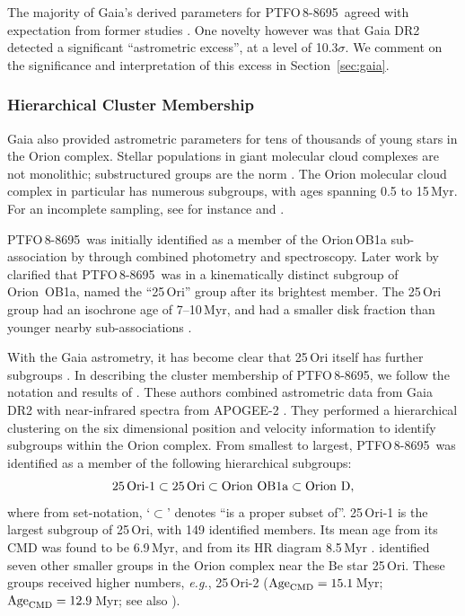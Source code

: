 \documentclass[12pt,twocolumn,tighten]{aastex62}
\newcommand{\ptfo}{PTFO$\,$8-8695}
\begin{document}
The majority of Gaia's derived parameters for \ptfo\ agreed with
expectation from former studies
\citep{briceno_cida_2005,van_eyken_ptf_2012}.  One novelty however was
that Gaia DR2 detected a significant ``astrometric excess'', at a
level of 10.3$\sigma$.  We comment on the significance and
interpretation of this excess in Section~\ref{sec:gaia}.


\subsubsection{Hierarchical Cluster Membership}
\label{subsec:hierarchical}

Gaia also provided astrometric parameters for tens of thousands of
young stars in the Orion complex.  Stellar populations in giant
molecular cloud complexes are not monolithic; substructured groups are
the norm \citep{briceno_lowmassOB_2007}.  The Orion molecular cloud
complex in particular has numerous subgroups, with ages spanning 0.5
to 15$\,$Myr. For an incomplete sampling, see for instance
\citet{briceno_cida_2005,jeffries_kinematic_2006,briceno_25_2007,kounkel_apogee2_2018}
and \citet{briceno_cidaII_2019}.

\ptfo\ was initially identified as a member of the Orion$\,$OB1a
sub-association by \citet{briceno_cida_2005} through combined
photometry and spectroscopy.  Later work by \citet{briceno_25_2007}
clarified that \ptfo\ was in a kinematically distinct subgroup of
Orion~OB1a, named the ``25$\,$Ori'' group after its brightest
member. The 25$\,$Ori group had an isochrone age of 7--10$\,$Myr, and
had a smaller disk fraction than younger nearby sub-associations
\citep{hernandez_spitzer_ob1_2007}.

With the Gaia astrometry, it has become clear that 25$\,$Ori itself
has further subgroups
\citep{kounkel_apogee2_2018,briceno_cidaII_2019}.  In describing the
cluster membership of \ptfo, we follow the notation and results of
\citet{kounkel_apogee2_2018}.  These authors combined astrometric data
from Gaia DR2 with near-infrared spectra from APOGEE-2
\citep{gunn_sdss_2006,majewski_apache_2017,blanton_sloan_2017,zasowski_target_2017,cottle_apogee2_2018}.
They performed a hierarchical clustering on the six dimensional
position and velocity information to identify subgroups within the
Orion complex.  From smallest to largest, \ptfo\ was identified
as a member of the following hierarchical subgroups:
\begin{equation}
  {\rm 25\,Ori\text{-}1}
  \subset {\rm 25\,Ori}
  \subset {\rm Orion\ OB1a}
  \subset {\rm Orion\ D},
\end{equation}
where from set-notation, `$\subset$' denotes ``is a proper subset
of''.  25$\,$Ori-1 is the largest subgroup of 25$\,$Ori, with 149
identified members.  Its mean age from its CMD was found to be
6.9$\,$Myr, and from its HR diagram 8.5$\,$Myr
\citep{kounkel_apogee2_2018}.  \citet{kounkel_apogee2_2018} identified
seven other smaller groups in the Orion complex near the Be star
25$\,$Ori. These groups received higher numbers, {\it e.g.},
25$\,$Ori-2 (${\rm Age}_{\rm CMD} =15.1\,$Myr; ${\rm Age}_{\rm CMD}
=12.9\,$Myr; see also \citealt{briceno_cidaII_2019}).
\end{document}
